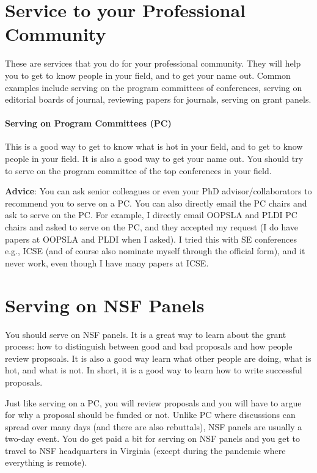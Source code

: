 \documentclass[oneside,11pt]{memoir}
\begin{document}
\section{Service to your Professional Community}

These are services that you do for your professional community. They will help you to get to know people in your field, and to get your name out.  Common examples include serving on the program committees of conferences, serving on editorial boards of journal, reviewing papers for journals, serving on grant panels.

\paragraph{Serving on Program Committees (PC)} This is a good way to get to know what is hot in your field, and to get to know people in your field.  It is also a good way to get your name out.
You should try to serve on the program committee of the top conferences in your field.

\textbf{Advice}: You can ask senior colleagues or even your PhD advisor/collaborators to recommend you to serve on a PC. You can also directly email the PC chairs and ask to serve on the PC.  For example, I directly email OOPSLA and PLDI PC chairs and asked to serve on the PC, and they accepted my request (I do have papers at OOPSLA and PLDI when I asked). I tried this with SE conferences  e.g., ICSE (and of course also nominate myself through the official form), and it never work, even though I have many papers at ICSE.


\section{Serving on NSF Panels} You should serve on NSF panels.  It is a great way to learn about the grant process: how to distinguish between good and bad proposals and how people review propsoals.
It is also a good way learn what other people are doing, what is hot, and what is not. In short, it is a good way to learn how to write successful proposals.

Just like serving on a PC, you will review proposals and you will have to argue for why a proposal should be funded or not.  Unlike PC where discussions can spread over many days (and there are also rebuttals), NSF panels are usually a two-day event.  You do get paid a bit for serving on NSF panels and you get to travel to NSF headquarters in Virginia (except during the pandemic where everything is remote).
\end{document}
